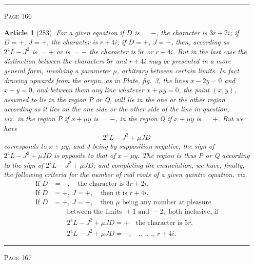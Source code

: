 \documentclass[11pt,a4paper]{article}
\theoremstyle{cayley}
\newtheorem{art}{Article}
\begin{document}
\vspace{1em}
\noindent\rule{\textwidth}{0.4pt}
\begin{center}\textsc{Page 166}\end{center}
\newpage

\begin{art}[283]
For a given equation if $D$ is $=-$, the character is $3r+2i$; if $D=+$, $J=+$, the character is $r+4i$; if $D=+$, $J=-$, then, according as $2^4L-J^2$ is $=+$ or is $=-$ the character is $5r$ or $r+4i$. But in the last case the distinction between the characters $5r$ and $r+4i$ may be presented in a more general form, involving a parameter $\mu$, arbitrary between certain limits. In fact drawing upwards from the origin, as in Plate, fig.~3, the lines $x-2y=0$ and $x+y=0$, and between them any line whatever $x+\mu y = 0$, the point $(x, y)$, assumed to lie in the region P or Q, will lie in the one or the other region according as it lies on the one side or the other side of the line in question, viz.\ in the region P if $x+\mu y$ is $=-$, in the region Q if $x+\mu y$ is $=+$. But we have
\[
2^4L - J^2 + \mu JD
\]
corresponds to $x+\mu y$, and $J$ being by supposition negative, the sign of $2^4L - J^2 + \mu JD$ is opposite to that of $x+\mu y$. The region is thus P or Q according to the sign of $2^4L - J^2 + \mu JD$; and completing the enunciation, we have, finally, the following criteria for the number of real roots of a given quintic equation, viz.
\begin{align*}
\text{If } D &= -, \quad\text{the character is } 3r+2i, \\
\text{If } D &= +,\ J = +, \quad\text{then it is } r+4i, \\
\text{If } D &= +,\ J = -, \quad\text{then } \mu \text{ being any number at pleasure}\\
&\qquad\text{between the limits } +1 \text{ and } -2, \text{ both inclusive, if} \\
&\qquad 2^4L - J^2 + \mu JD = + \quad\text{the character is } 5r, \\
&\qquad 2^4L - J^2 + \mu JD = -, \quad\text{,, ,, ,, } r+4i.
\end{align*}
\end{art}

\vspace{1em}
\noindent\rule{\textwidth}{0.4pt}
\begin{center}\textsc{Page 167}\end{center}
\newpage
\end{document}
